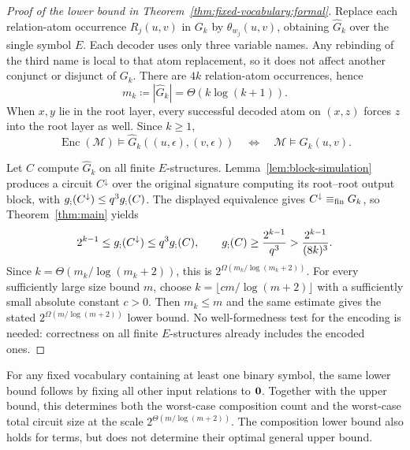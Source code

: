 \begin{proof}[Proof of the lower bound in Theorem~\ref{thm:fixed-vocabulary:formal}]
Replace each relation-atom occurrence $R_j(u,v)$ in $G_k$ by
$\theta_{w_j}(u,v)$, obtaining $\widehat G_k$ over the single symbol $E$.
Each decoder uses only three variable names. Any rebinding of the
third name is local to that atom replacement, so it does not affect
another conjunct or disjunct of $G_k$.
There are $4k$ relation-atom occurrences, hence
\[
 m_k\coloneqq|\widehat G_k|=\Theta(k\log(k+1)).
\]
When $x,y$ lie in the root layer, every successful decoded atom on
$(x,z)$ forces $z$ into the root layer as well. Since $k\ge1$,
\[
 \operatorname{Enc}(\mathcal M)\models
 \widehat G_k((u,\epsilon),(v,\epsilon))
 \quad\Longleftrightarrow\quad
 \mathcal M\models G_k(u,v).
\]

Let $C$ compute $\widehat G_k$ on all finite $E$-structures.
Lemma~\ref{lem:block-simulation} produces a circuit $C^\downarrow$
over the original signature computing its root--root output block,
with $g_{;}(C^\downarrow)\le q^3g_{;}(C)$.
The displayed equivalence gives $C^\downarrow\equiv_{\mathrm{fin}} G_k$, so
Theorem~\ref{thm:main} yields
\[
 2^{k-1}\le g_{;}(C^\downarrow)\le q^3g_{;}(C),
 \qquad
 g_{;}(C)\ge\frac{2^{k-1}}{q^3}
       >\frac{2^{k-1}}{(8k)^3}.
\]
Since $k=\Theta(m_k/\log(m_k+2))$, this is
$2^{\Omega(m_k/\log(m_k+2))}$.
For every sufficiently large size bound $m$, choose
$k=\lfloor c m/\log(m+2)\rfloor$ with a sufficiently small absolute
constant $c>0$. Then $m_k\le m$ and the same estimate gives the
stated $2^{\Omega(m/\log(m+2))}$ lower bound.
No well-formedness test for the encoding is needed: correctness on
all finite $E$-structures already includes the encoded ones.
\end{proof}

For any fixed vocabulary containing at least one binary symbol, the
same lower bound follows by fixing all other input relations to
$\mathbf{0}$. Together with the upper bound, this determines both the
worst-case composition count and the worst-case total circuit size
at the scale $2^{\Theta(m/\log(m+2))}$.
The composition lower bound also holds for terms, but does not
determine their optimal general upper bound.

